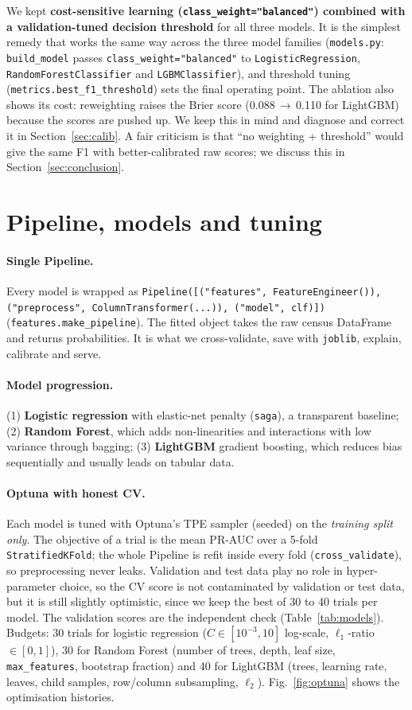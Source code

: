 \documentclass[10.5pt,a4paper]{article}
\newcommand{\code}[1]{\texttt{\small #1}}
\begin{document}
We kept \textbf{cost-sensitive learning (\code{class\_weight="balanced"}) combined with a validation-tuned
decision threshold} for all three models. It is the simplest remedy that works the same way across the
three model families (\code{models.py}: \code{build\_model} passes \code{class\_weight="balanced"} to
\code{LogisticRegression}, \code{RandomForestClassifier} and \code{LGBMClassifier}), and threshold tuning
(\code{metrics.best\_f1\_threshold}) sets the final operating point. The ablation also shows its cost:
reweighting raises the Brier score (0.088\,$\rightarrow$\,0.110 for LightGBM) because the scores are pushed
up. We keep this in mind and diagnose and correct it in Section~\ref{sec:calib}. A fair criticism is that
``no weighting + threshold'' would give the same F1 with better-calibrated raw scores; we discuss this in
Section~\ref{sec:conclusion}.

\section{Pipeline, models and tuning}
\label{sec:pipeline}
\paragraph{Single Pipeline.} Every model is wrapped as
\code{Pipeline([("features", FeatureEngineer()), ("preprocess", ColumnTransformer(...)), ("model", clf)])}
(\code{features.make\_pipeline}). The fitted object takes the raw census DataFrame and returns
probabilities. It is what we cross-validate, save with \code{joblib}, explain, calibrate and serve.

\paragraph{Model progression.} (1) \textbf{Logistic regression} with elastic-net penalty (\code{saga}),
a transparent baseline; (2) \textbf{Random Forest}, which adds non-linearities and interactions with
low variance through bagging; (3) \textbf{LightGBM} gradient boosting, which reduces bias sequentially
and usually leads on tabular data.

\paragraph{Optuna with honest CV.} Each model is tuned with Optuna's TPE sampler (seeded) on the
\emph{training split only}. The objective of a trial is the mean PR-AUC over a 5-fold
\code{StratifiedKFold}; the whole Pipeline is refit inside every fold (\code{cross\_validate}), so
preprocessing never leaks. Validation and test data play no role in hyper-parameter choice, so the CV
score is not contaminated by validation or test data, but it is still slightly optimistic, since we keep the
best of 30 to 40 trials per model. The validation scores are the independent check (Table~\ref{tab:models}). Budgets: 30 trials for logistic regression ($C\in[10^{-3},10]$
log-scale, $\ell_1$-ratio $\in[0,1]$), 30 for Random Forest (number of trees, depth, leaf size,
\code{max\_features}, bootstrap fraction) and 40 for LightGBM (trees, learning rate, leaves, child samples,
row/column subsampling, $\ell_2$). Fig.~\ref{fig:optuna} shows the optimisation histories.
\end{document}
